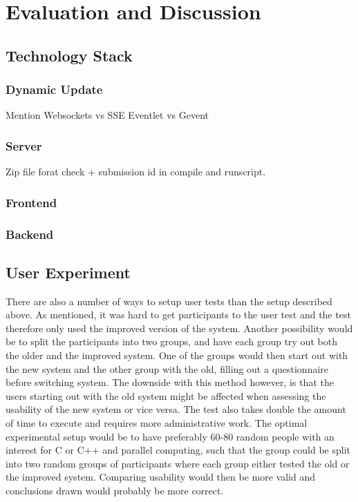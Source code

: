 \chapter{Evaluation and Discussion}
\label{ch:evaluation}

\section{Technology Stack}
\label{sec:eval-tech}

\subsection{Dynamic Update}
Mention Websockets vs SSE
Eventlet vs Gevent

\subsection{Server}
Zip file forat check + submission id in compile and runscript.

\subsection{Frontend}

\subsection{Backend}

\section{User Experiment}
\label{sec:eval-user-testing}
There are also a number of ways to setup user tests than the setup described above. As mentioned, it was hard to get participants to the user test and the test therefore only used the improved version of the system. Another possibility would be to split the participants into two groups, and have each group try out both the older and the improved system. One of the groups would then start out with the new system and the other group with the old, filling out a questionnaire before switching system. The downside with this method however, is that the users starting out with the old system might be affected when assessing the usability of the new system or vice versa. The test also takes double the amount of time to execute and requires more administrative work. The optimal experimental setup would be to have preferably 60-80 random people with an interest for C or C++ and parallel computing, such that the group could be split into two random groups of participants where each group either tested the old or the improved system. Comparing usability would then be more valid and conclusions drawn would probably be more correct.

